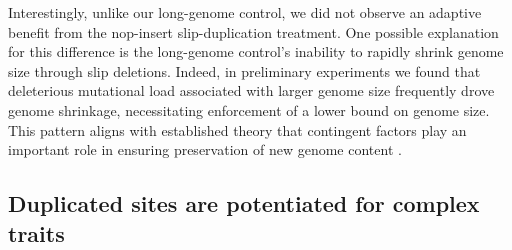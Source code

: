 Interestingly, unlike our long-genome control, we did not observe an adaptive benefit from the nop-insert slip-duplication treatment.
One possible explanation for this difference is the long-genome control's inability to rapidly shrink genome size through slip deletions.
Indeed, in preliminary experiments we found that deleterious mutational load associated with larger genome size frequently drove genome shrinkage, necessitating enforcement of a lower bound on genome size.
This pattern aligns with established theory that contingent factors play an important role in ensuring preservation of new genome content \citep{Innan2010}.





\subsection{Duplicated sites are potentiated for complex traits}


